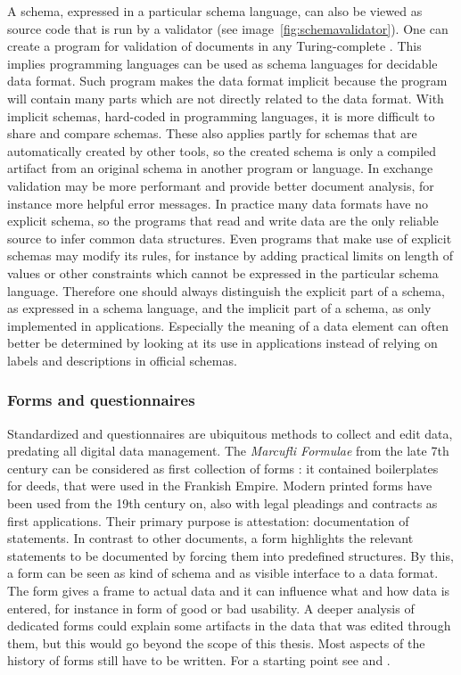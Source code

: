 A schema, expressed in a particular schema language, can also be viewed as
source code that is run by a validator (see image~\ref{fig:schemavalidator}).
One can create a program for validation of documents in any Turing-complete
. This implies programming languages can be used as
schema languages for decidable data format. Such program makes the data format
implicit because the program will contain many parts which are not directly
related to the data format. With implicit schemas, hard-coded in programming
languages, it is more difficult to share and compare schemas. These also
applies partly for schemas that are automatically created by other tools, so
the created schema is only a compiled artifact from an original schema in
another program or language. In exchange validation may be more performant and
provide better document analysis, for instance more helpful error messages.  In
practice many data formats have no explicit schema, so the programs that read
and write data are the only reliable source to infer common data structures.
Even programs that make use of explicit schemas may modify its rules, for
instance by adding practical limits on length of values or other constraints
which cannot be expressed in the particular schema language. Therefore one
should always distinguish the explicit part of a schema, as expressed in a
schema language, and the implicit part of a schema, as only implemented in
applications.  Especially the meaning of a data element can often better be
determined by looking at its use in applications instead of relying on labels
and descriptions in official schemas.


\subsubsection{Forms and questionnaires}
\label{sec:forms}

Standardized  and questionnaires are ubiquitous methods to
collect and edit data, predating all digital data management. The
\textit{Marcufli Formulae} from the late 7th century can be considered as first
collection of forms \cite{Zeumer2001}: it contained boilerplates for deeds,
that were used in the Frankish Empire. Modern printed forms have been used from
the 19th century on, also with legal pleadings and contracts as first
applications. Their primary purpose is attestation: documentation of
statements. In contrast to other documents, a form highlights the relevant
statements to be documented by forcing them into predefined structures. By
this, a form can be seen as kind of schema and as visible interface to a data format.
The form gives a frame to actual data and it can influence what and how
data is entered, for instance in form of good or bad usability. A deeper
analysis of dedicated forms could explain some artifacts in the data that was
edited through them, but this would go beyond the scope of this thesis. Most
aspects of the history of forms still have to be written. For a starting point
see \textcite{Becker2007} and \textcite{Grosse1980}.

